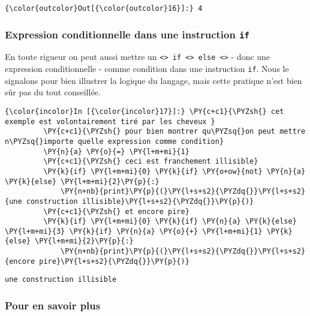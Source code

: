 \begin{Verbatim}[commandchars=\\\{\}]
{\color{outcolor}Out[{\color{outcolor}16}]:} 4
\end{Verbatim}
            
    \hypertarget{expression-conditionnelle-dans-une-instruction-if}{%
\subsubsection{\texorpdfstring{Expression conditionnelle dans une
instruction
\texttt{if}}{Expression conditionnelle dans une instruction if}}\label{expression-conditionnelle-dans-une-instruction-if}}

    En toute rigueur on peut aussi mettre un
\texttt{\textless{}\textgreater{}\ if\ \textless{}\textgreater{}\ else\ \textless{}\textgreater{}}
- donc une expression conditionnelle - comme condition dans une
instruction \texttt{if}. Nous le signalons pour bien illustrer la
logique du langage, mais cette pratique n'est bien sûr pas du tout
conseillée.

    \begin{Verbatim}[commandchars=\\\{\}]
{\color{incolor}In [{\color{incolor}17}]:} \PY{c+c1}{\PYZsh{} cet exemple est volontairement tiré par les cheveux }
         \PY{c+c1}{\PYZsh{} pour bien montrer qu\PYZsq{}on peut mettre n\PYZsq{}importe quelle expression comme condition}
         \PY{n}{a} \PY{o}{=} \PY{l+m+mi}{1}
         \PY{c+c1}{\PYZsh{} ceci est franchement illisible}
         \PY{k}{if} \PY{l+m+mi}{0} \PY{k}{if} \PY{o+ow}{not} \PY{n}{a} \PY{k}{else} \PY{l+m+mi}{2}\PY{p}{:}
             \PY{n+nb}{print}\PY{p}{(}\PY{l+s+s2}{\PYZdq{}}\PY{l+s+s2}{une construction illisible}\PY{l+s+s2}{\PYZdq{}}\PY{p}{)}
         \PY{c+c1}{\PYZsh{} et encore pire}
         \PY{k}{if} \PY{l+m+mi}{0} \PY{k}{if} \PY{n}{a} \PY{k}{else} \PY{l+m+mi}{3} \PY{k}{if} \PY{n}{a} \PY{o}{+} \PY{l+m+mi}{1} \PY{k}{else} \PY{l+m+mi}{2}\PY{p}{:}
             \PY{n+nb}{print}\PY{p}{(}\PY{l+s+s2}{\PYZdq{}}\PY{l+s+s2}{encore pire}\PY{l+s+s2}{\PYZdq{}}\PY{p}{)}
\end{Verbatim}


    \begin{Verbatim}[commandchars=\\\{\}]
une construction illisible

    \end{Verbatim}

    \hypertarget{pour-en-savoir-plus}{%
\subsubsection{Pour en savoir plus}\label{pour-en-savoir-plus}}

